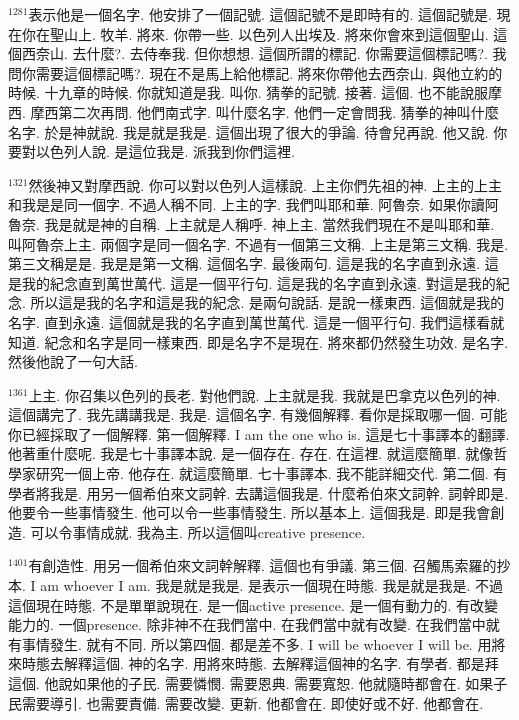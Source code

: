 \documentclass{book}
\begin{document}
$^{1281}$表示他是一個名字.
他安排了一個記號.
這個記號不是即時有的.
這個記號是.
現在你在聖山上.
牧羊.
將來.
你帶一些.
以色列人出埃及.
將來你會來到這個聖山.
這個西奈山.
去什麼?.
去侍奉我.
但你想想.
這個所謂的標記.
你需要這個標記嗎?.
我問你需要這個標記嗎?.
現在不是馬上給他標記.
將來你帶他去西奈山.
與他立約的時候.
十九章的時候.
你就知道是我.
叫你.
猜拳的記號.
接著.
這個.
也不能說服摩西.
摩西第二次再問.
他們南式字.
叫什麼名字.
他們一定會問我.
猜拳的神叫什麼名字.
於是神就說.
我是就是我是.
這個出現了很大的爭論.
待會兒再說.
他又說.
你要對以色列人說.
是這位我是.
派我到你們這裡.

$^{1321}$然後神又對摩西說.
你可以對以色列人這樣說.
上主你們先祖的神.
上主的上主和我是是同一個字.
不過人稱不同.
上主的字.
我們叫耶和華.
阿魯奈.
如果你讀阿魯奈.
我是就是神的自稱.
上主就是人稱呼.
神上主.
當然我們現在不是叫耶和華.
叫阿魯奈上主.
兩個字是同一個名字.
不過有一個第三文稱.
上主是第三文稱.
我是.
第三文稱是是.
我是是第一文稱.
這個名字.
最後兩句.
這是我的名字直到永遠.
這是我的紀念直到萬世萬代.
這是一個平行句.
這是我的名字直到永遠.
對這是我的紀念.
所以這是我的名字和這是我的紀念.
是兩句說話.
是說一樣東西.
這個就是我的名字.
直到永遠.
這個就是我的名字直到萬世萬代.
這是一個平行句.
我們這樣看就知道.
紀念和名字是同一樣東西.
即是名字不是現在.
將來都仍然發生功效.
是名字.
然後他說了一句大話.

$^{1361}$上主.
你召集以色列的長老.
對他們說.
上主就是我.
我就是巴拿克以色列的神.
這個講完了.
我先講講我是.
我是.
這個名字.
有幾個解釋.
看你是採取哪一個.
可能你已經採取了一個解釋.
第一個解釋.
I am the one who is.
這是七十事譯本的翻譯.
他著重什麼呢.
我是七十事譯本說.
是一個存在.
存在.
在這裡.
就這麼簡單.
就像哲學家研究一個上帝.
他存在.
就這麼簡單.
七十事譯本.
我不能詳細交代.
第二個.
有學者將我是.
用另一個希伯來文詞幹.
去講這個我是.
什麼希伯來文詞幹.
詞幹即是.
他要令一些事情發生.
他可以令一些事情發生.
所以基本上.
這個我是.
即是我會創造.
可以令事情成就.
我為主.
所以這個叫creative presence.

$^{1401}$有創造性.
用另一個希伯來文詞幹解釋.
這個也有爭議.
第三個.
召觸馬索羅的抄本.
I am whoever I am.
我是就是我是.
是表示一個現在時態.
我是就是我是.
不過這個現在時態.
不是單單說現在.
是一個active presence.
是一個有動力的.
有改變能力的.
一個presence.
除非神不在我們當中.
在我們當中就有改變.
在我們當中就有事情發生.
就有不同.
所以第四個.
都是差不多.
I will be whoever I will be.
用將來時態去解釋這個.
神的名字.
用將來時態.
去解釋這個神的名字.
有學者.
都是拜這個.
他說如果他的子民.
需要憐憫.
需要恩典.
需要寬恕.
他就隨時都會在.
如果子民需要導引.
也需要責備.
需要改變.
更新.
他都會在.
即使好或不好.
他都會在.
\end{document}
